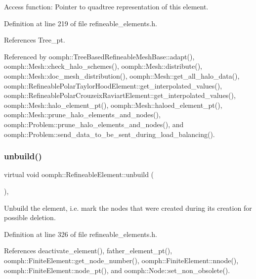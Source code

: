 Access function\+: Pointer to quadtree representation of this element. 



Definition at line 219 of file refineable\+\_\+elements.\+h.



References Tree\+\_\+pt.



Referenced by oomph\+::\+Tree\+Based\+Refineable\+Mesh\+Base\+::adapt(), oomph\+::\+Mesh\+::check\+\_\+halo\+\_\+schemes(), oomph\+::\+Mesh\+::distribute(), oomph\+::\+Mesh\+::doc\+\_\+mesh\+\_\+distribution(), oomph\+::\+Mesh\+::get\+\_\+all\+\_\+halo\+\_\+data(), oomph\+::\+Refineable\+Polar\+Taylor\+Hood\+Element\+::get\+\_\+interpolated\+\_\+values(), oomph\+::\+Refineable\+Polar\+Crouzeix\+Raviart\+Element\+::get\+\_\+interpolated\+\_\+values(), oomph\+::\+Mesh\+::halo\+\_\+element\+\_\+pt(), oomph\+::\+Mesh\+::haloed\+\_\+element\+\_\+pt(), oomph\+::\+Mesh\+::prune\+\_\+halo\+\_\+elements\+\_\+and\+\_\+nodes(), oomph\+::\+Problem\+::prune\+\_\+halo\+\_\+elements\+\_\+and\+\_\+nodes(), and oomph\+::\+Problem\+::send\+\_\+data\+\_\+to\+\_\+be\+\_\+sent\+\_\+during\+\_\+load\+\_\+balancing().

\mbox{\label{classoomph_1_1RefineableElement_a46448576f1938e3c50ca10b9fc849c8b}} 
\subsubsection{\texorpdfstring{unbuild()}{unbuild()}}
{\footnotesize\ttfamily virtual void oomph\+::\+Refineable\+Element\+::unbuild (\begin{DoxyParamCaption}{ }\end{DoxyParamCaption})\hspace{0.3cm}{\ttfamily [inline]}, {\ttfamily [virtual]}}



Unbuild the element, i.\+e. mark the nodes that were created during its creation for possible deletion. 



Definition at line 326 of file refineable\+\_\+elements.\+h.



References deactivate\+\_\+element(), father\+\_\+element\+\_\+pt(), oomph\+::\+Finite\+Element\+::get\+\_\+node\+\_\+number(), oomph\+::\+Finite\+Element\+::nnode(), oomph\+::\+Finite\+Element\+::node\+\_\+pt(), and oomph\+::\+Node\+::set\+\_\+non\+\_\+obsolete().



